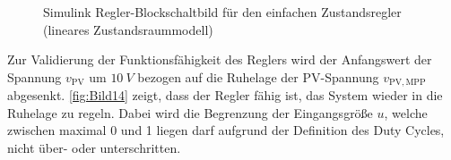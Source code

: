 \begin{figure}[H]
    \centering
    \caption[Einfacher Zustandsregler Simulink (linear)]{Simulink Regler-Blockschaltbild für den einfachen Zustandsregler (lineares Zustandsraummodell)}
    \label{fig:Bild13}
\end{figure}

Zur Validierung der Funktionsfähigkeit des Reglers wird der Anfangswert der Spannung $v_{\mathrm{PV}}$ um $\SI{10}{V}$ bezogen auf die Ruhelage der PV-Spannung $v_{\mathrm{PV,MPP}}$ abgesenkt. \autoref{fig:Bild14} zeigt, dass der Regler fähig ist, das System wieder in die Ruhelage zu regeln. Dabei wird die Begrenzung der Eingangsgröße $u$, welche zwischen maximal 0 und 1 liegen darf aufgrund der Definition des Duty Cycles, nicht über- oder unterschritten.

